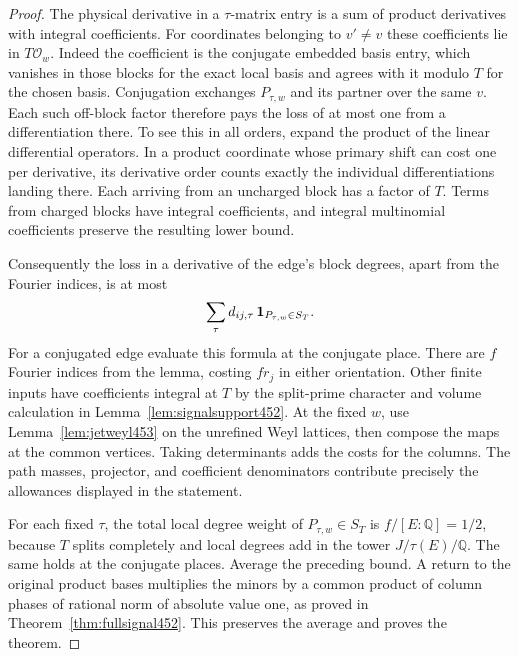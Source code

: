 \documentclass[a4paper,11pt]{article}
\theoremstyle{definition}
\theoremstyle{remark}
\numberwithin{equation}{section}
\begin{document}
\begin{proof}
The physical derivative in a \(\tau\)-matrix entry is a sum of
product derivatives with integral coefficients. For coordinates
belonging to \(v'\ne v\) these coefficients lie in \(T\mathcal O_w\).
Indeed the coefficient is the conjugate embedded basis entry,
which vanishes in those blocks for the exact local basis and
agrees with it modulo \(T\) for the chosen basis. Conjugation
exchanges \(P_{\tau,w}\) and its partner over the same \(v\).
Each such off-block factor therefore pays the loss of at most
one from a differentiation there. To see this in all orders,
expand the product of the linear differential operators. In a
product coordinate whose primary shift can cost one per
derivative, its derivative order counts exactly the individual
differentiations landing there. Each arriving from an uncharged
block has a factor of \(T\). Terms from charged blocks have
integral coefficients, and integral multinomial coefficients
preserve the resulting lower bound.

Consequently the loss in a derivative of the edge's block
degrees, apart from the Fourier indices, is at most
\[
       \sum_\tau d_{ij,\tau}\,
                       {\bf1}_{P_{\tau,w}\in S_T}.
\]
For a conjugated edge evaluate this formula at the conjugate
place. There are \(f\) Fourier indices from the lemma, costing
\(fr_j\) in either orientation. Other finite inputs have
coefficients integral at \(T\) by the split-prime character
and volume calculation in Lemma~\ref{lem:signalsupport452}.
At the fixed \(w\), use Lemma~\ref{lem:jetweyl453} on the
unrefined Weyl lattices, then compose the maps at the common
vertices. Taking determinants adds the costs for the columns.
The path masses, projector, and coefficient denominators
contribute precisely the allowances displayed in the statement.

For each fixed \(\tau\), the total local degree weight of
\(P_{\tau,w}\in S_T\) is \(f/[E:\mathbb Q]=1/2\), because
\(T\) splits completely and local degrees add in the tower
\(J/\tau(E)/\mathbb Q\). The same holds at the conjugate places.
Average the preceding bound. A return to the original product
bases multiplies the minors by a common product of column
phases of rational norm of absolute value one, as proved in
Theorem~\ref{thm:fullsignal452}. This preserves the average
and proves the theorem.
\end{proof}
\end{document}
